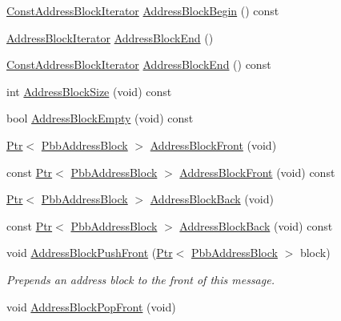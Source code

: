 \begin{DoxyCompactItemize}
\hyperlink{classns3_1_1PbbMessage_ac6e5429e1135918dd1791a4b92a09a56}{Const\+Address\+Block\+Iterator} \hyperlink{classns3_1_1PbbMessage_a9875e4eee335d87d35887ee0558bd24c}{Address\+Block\+Begin} () const 
\item 
\hyperlink{classns3_1_1PbbMessage_a9ab666cb1f964e91878353ded8a8f303}{Address\+Block\+Iterator} \hyperlink{classns3_1_1PbbMessage_a4345c092167c0e61584a7bbe2f5e73cb}{Address\+Block\+End} ()
\item 
\hyperlink{classns3_1_1PbbMessage_ac6e5429e1135918dd1791a4b92a09a56}{Const\+Address\+Block\+Iterator} \hyperlink{classns3_1_1PbbMessage_ad7bf75cf8dac241aececd72a566aca08}{Address\+Block\+End} () const 
\item 
int \hyperlink{classns3_1_1PbbMessage_a65053d3200c0be94b7c4a515f93f9403}{Address\+Block\+Size} (void) const 
\item 
bool \hyperlink{classns3_1_1PbbMessage_aa964978f996d5d5268b2c839ef841550}{Address\+Block\+Empty} (void) const 
\item 
\hyperlink{classns3_1_1Ptr}{Ptr}$<$ \hyperlink{classns3_1_1PbbAddressBlock}{Pbb\+Address\+Block} $>$ \hyperlink{classns3_1_1PbbMessage_a3b33f1723444cd172ae3d6a4765d0332}{Address\+Block\+Front} (void)
\item 
const \hyperlink{classns3_1_1Ptr}{Ptr}$<$ \hyperlink{classns3_1_1PbbAddressBlock}{Pbb\+Address\+Block} $>$ \hyperlink{classns3_1_1PbbMessage_a959fa75c43ab2aef3fc75c754adbc3a8}{Address\+Block\+Front} (void) const 
\item 
\hyperlink{classns3_1_1Ptr}{Ptr}$<$ \hyperlink{classns3_1_1PbbAddressBlock}{Pbb\+Address\+Block} $>$ \hyperlink{classns3_1_1PbbMessage_a5b2ea79ebbd46d14e374e11c6db13b59}{Address\+Block\+Back} (void)
\item 
const \hyperlink{classns3_1_1Ptr}{Ptr}$<$ \hyperlink{classns3_1_1PbbAddressBlock}{Pbb\+Address\+Block} $>$ \hyperlink{classns3_1_1PbbMessage_a7e57f6d04620a31bedd25fb6d17c2ed6}{Address\+Block\+Back} (void) const 
\item 
void \hyperlink{classns3_1_1PbbMessage_a03ef089aa9a64ebf0f2a93e39e13699c}{Address\+Block\+Push\+Front} (\hyperlink{classns3_1_1Ptr}{Ptr}$<$ \hyperlink{classns3_1_1PbbAddressBlock}{Pbb\+Address\+Block} $>$ block)
\begin{DoxyCompactList}\small\item\em Prepends an address block to the front of this message. \end{DoxyCompactList}\item 
void \hyperlink{classns3_1_1PbbMessage_a634f851cd9437951648c30b124ce35cc}{Address\+Block\+Pop\+Front} (void)

\end{DoxyCompactItemize}
